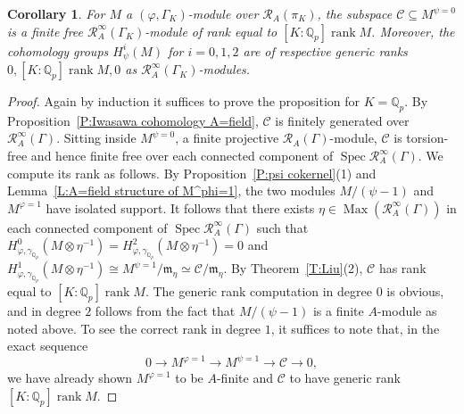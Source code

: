 \documentclass[12pt]{article}
\newtheorem{cor}[theorem]{Corollary}
\theoremstyle{definition}
\numberwithin{equation}{theorem}
\newcommand{\calR}{\mathcal{R}}
\newcommand{\gothm}{\mathfrak{m}}
\newcommand{\QQ}{\mathbb{Q}}
\newcommand{\scrC}{\mathscr{C}}
\def\Qp{\QQ_p}
\DeclareMathOperator{\Max}{Max}
\DeclareMathOperator{\rank}{rank}
\DeclareMathOperator{\Spec}{Spec}
\begin{document}
\begin{cor}
\label{C:scrC is free}
For $M$ a $(\varphi, \Gamma_K)$-module over $\calR_A(\pi_K)$, the subspace $\scrC \subseteq M^{\psi=0}$ is a finite free $\calR_A^\infty(\Gamma_K)$-module of rank equal to $[K:\Qp]\rank M$.  Moreover, the cohomology groups $H_\psi^i(M)$ for $i=0,1,2$ are of respective generic ranks $0, [K:\Qp]\rank M, 0$ as $\calR_A^\infty(\Gamma_K)$-modules.
\end{cor}
\begin{proof}
Again by induction it suffices to prove the proposition for $K=\Qp$.
By Proposition~\ref{P:Iwasawa cohomology A=field}, $\scrC$ is finitely
generated over $\calR_A^\infty(\Gamma)$.  Sitting inside $M^{\psi=0}$,
a finite projective $\calR_A(\Gamma)$-module, $\scrC$ is torsion-free
and hence finite free over each connected component of $\Spec
\calR_A^\infty(\Gamma)$.  We compute its rank as follows.  By
Proposition~\ref{P:psi cokernel}(1) and Lemma~\ref{L:A=field structure
  of M^phi=1}, the two modules $M/(\psi-1)$ and $M^{\varphi=1}$ have
isolated support.  It follows that there exists $\eta \in
\Max(\calR_A^\infty(\Gamma))$ in each connected component of $\Spec
\calR_A^\infty(\Gamma)$ such that $H^0_{\varphi, \gamma_{\Qp}}(M
\otimes \eta^{-1}) = H^2_{\varphi, \gamma_{\Qp}}(M \otimes \eta^{-1})
= 0$ and $H^1_{\varphi, \gamma_{\Qp}}(M \otimes \eta^{-1}) \cong
M^{\psi=1}/\gothm_\eta \simeq \scrC / \gothm_\eta$.  By
Theorem~\ref{T:Liu}(2), $\scrC$ has rank equal to $[K:\Qp]\rank M$.
The generic rank computation in degree $0$ is obvious, and in degree
$2$ follows from the fact that $M/(\psi-1)$ is a finite $A$-module as
noted above.  To see the correct rank in degree $1$, it suffices to
note that, in the exact sequence
\[
0 \to M^{\varphi=1} \to M^{\psi=1} \to \scrC \to 0,
\]
we have already shown $M^{\varphi=1}$ to be $A$-finite and $\scrC$ to
have generic rank $[K:\Qp]\rank M$.
\end{proof}
\end{document}
